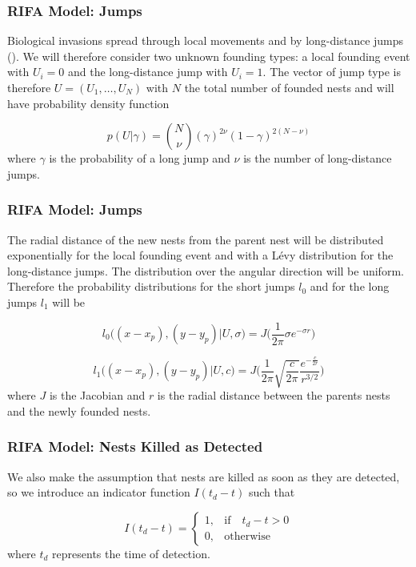 \documentclass[9pt, xcolor={dvipsnames,svgnames,table}]{beamer}
\begin{document}
\begin{frame}
\frametitle{RIFA Model: Jumps}
    Biological invasions spread through \textcolor{PineGreen}{local movements} and by \textcolor{PineGreen}{long-distance jumps (\cite{Suarez})}. We will therefore consider two unknown founding types: a local founding event with $U_i = 0$ and the long-distance jump with $U_i = 1$. The vector of jump type is therefore $U = (U_1, \dots, U_N)$ with $N$ the total number of founded nests and will have probability density function

    \begin{equation*}
        p(U| \gamma ) = {N \choose \nu}(\gamma)^{2\nu}(1 - \gamma)^{2(N - \nu)}
    \end{equation*}
    where $\gamma$ is the probability of a long jump and $\nu$ is the number of long-distance jumps.
\end{frame}


\begin{frame}
\frametitle{RIFA Model: Jumps}
    The radial distance of the new nests from the parent nest will be \textcolor{PineGreen}{distributed exponentially for the local founding event} and with a \textcolor{PineGreen}{L\'evy distribution for the long-distance jumps}. \textcolor{PineGreen}{The distribution over the angular direction will be uniform}.
    Therefore the probability distributions for the short jumps $l_0$ and for the long jumps $l_1$ will be

    \begin{equation*}
        l_0\Big((x - x_p), (y - y_p) | U, \sigma \Big)= J \bigg(\frac{1}{2 \pi} \sigma e^{- \sigma r}\bigg)
    \end{equation*}

    \begin{equation*}
        l_1\Big((x - x_p), (y - y_p) | U, c \Big)= J \bigg(\frac{1}{2 \pi} \sqrt{\frac{c}{2 \pi}} \frac{e^{- \frac{c}{ 2 r}}}{r^{3/2}}\bigg)
    \end{equation*}
    where $J$ is the Jacobian and $r$ is the radial distance between the parents nests and the newly founded nests.
\end{frame}





\begin{frame}
    \frametitle{RIFA Model: Nests Killed as Detected}
    We also make the assumption that \textcolor{PineGreen}{nests are killed as soon as they are detected}, so we introduce an indicator function $I(t_d - t)$ such that

    \begin{equation*}
        I (t_d - t) =
        \begin{cases}
            1, & \mbox{if} \quad t_d -  t> 0 \\
            0, & \mbox{otherwise}
        \end{cases}
    \end{equation*}
    where $t_d$ represents the time of detection. 
\end{frame}
    
\end{document}
